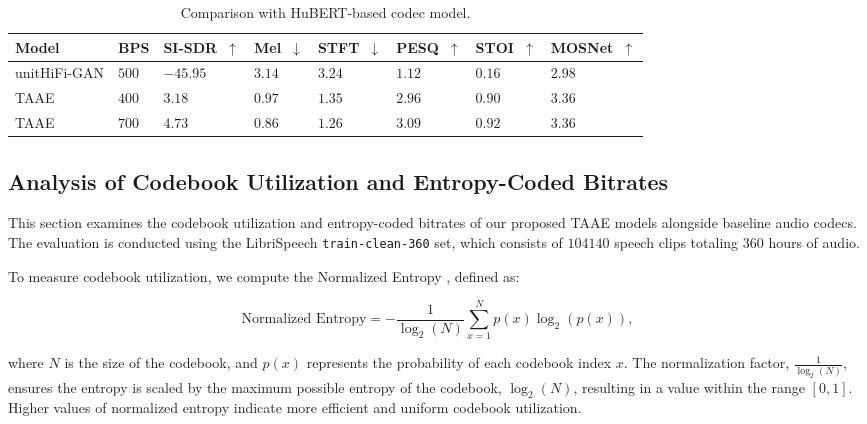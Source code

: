 \documentclass{article} %
\begin{document}
\begin{table}[t]
\centering
\scriptsize
\begin{tabularx}{0.9\textwidth}{
    >{\raggedright\arraybackslash}m{2cm} %
    >{\centering\arraybackslash}X %
    >{\centering\arraybackslash}X %
    >{\centering\arraybackslash}X %
    >{\centering\arraybackslash}X %
    >{\centering\arraybackslash}X %
    >{\centering\arraybackslash}X %
    >{\centering\arraybackslash}X %
}
\toprule
\textbf{Model} & \textbf{BPS} & \textbf{SI-SDR~$\uparrow$} & \textbf{Mel~$\downarrow$} & \textbf{STFT~$\downarrow$} & \textbf{PESQ~$\uparrow$} & \textbf{STOI~$\uparrow$} & \textbf{MOSNet~$\uparrow$} \\
\midrule
unitHiFi-GAN & $500$ & $-45.95$ & $3.14$ & $3.24$ & $1.12$ & $0.16$ & $2.98$ \\ 
TAAE & $400$  & $3.18$ & $0.97$ & $1.35$ & $2.96$ & $0.90$ & $3.36$\\
TAAE  & $700$ & $4.73$ & $0.86$ & $1.26$ & $3.09$ & $0.92$ & $3.36$ \\
\bottomrule
\end{tabularx}
\caption{Comparison with HuBERT-based codec model.}
\label{tab:hubert}
\end{table}

\subsection{Analysis of Codebook Utilization and Entropy-Coded Bitrates}
\label{app:huffman}

This section examines the codebook utilization and entropy-coded bitrates of our proposed TAAE models alongside baseline audio codecs. The evaluation is conducted using the LibriSpeech \texttt{train-clean-360} set, which consists of $104140$ speech clips totaling $360$ hours of audio. 


To measure codebook utilization, we compute the Normalized Entropy \citep{thomas2006elements}, defined as:

\[
\text{Normalized Entropy} = - \frac{1}{\log_2(N)} \sum_{x=1}^{N} p(x) \log_2(p(x)),
\]
 
where \(N\) is the size of the codebook, and \(p(x)\) represents the probability of each codebook index \(x\). 
The normalization factor, \(\frac{1}{\log_2(N)}\), ensures the entropy is scaled by the maximum possible entropy of the codebook, \(\log_2(N)\), 
resulting in a value within the range $[0, 1]$. Higher values of normalized entropy indicate more efficient and uniform codebook utilization.
\end{document}
